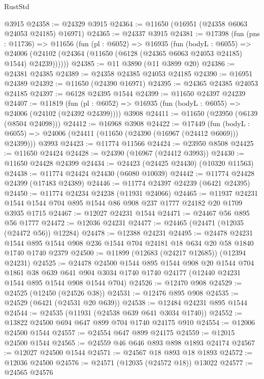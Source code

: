 \begin{lexlean}{RustStd}
\begin{coremodule}
    @3915
@24358 := @24329 @3915
@24364 := @11650 (@16951 (@24358 @6063 @24053 @24185) @16971)
@24365 := @24337 @3915
@24381 := @17398
    (fun (pns : @11736) =>
    @11656
      (fun (pl : @6052) =>
      @16935
        (fun (bodyL : @6055) =>
        @24006 (@24102 (@24364 (@11650 (@6128 (@24365 @6063 @24053 @24185) @1544) @24239))))))
@24385 := @11 @3890 (@11 @3899 @20)
@24386 := @24381 @24385
@24389 := @24358 @24385 @24053 @24185
@24390 := @16951 @24389
@24392 := @11650 (@24390 @16971)
@24395 := @24365 @24385 @24053 @24185
@24397 := @6128 @24395 @1544
@24399 := @11650 @24397 @24239
@24407 := @11819
    (fun (pl : @6052) => @16935 (fun (bodyL : @6055) => @24006 (@24102 (@24392 @24399))))
    @3908
@24411 := @11650 (@23950 (@6139 (@8504 @24098)))
@24412 := @16968 @3908
@24422 := @17449
    (fun (bodyL : @6055) => @24006 (@24411 (@11650 (@24390 (@16967 (@24412 @6069))) @24399)))
    @3993
@24423 := @11774 @11566
@24424 := @23950 @8508
@24425 := @11650 @24424
@24428 := @24390 (@16967 (@24412 @3993))
@24430 := @11650 @24428 @24399
@24434 := @24423 (@24425 @24430) (@10320 @11563)
@24438 := @11774 @24424 @24430 (@6080 @10039)
@24442 := @11774 @24428 @24399 (@17483 @24389)
@24446 := @11774 @24397 @24239 (@6421 @24395)
@24450 := @11774 @24234 @24238 (@11931 @24066)
@24465 := @11937 @24231 @1544 @1544 @704 @895 @1544 @86 @908 @237 @1777 @24182 @20 @1709 @3935 @1715
@24467 := @12027 @24231 @1544
@24471 := @24467 @56 @895 @56 @1777
@24472 := @12036 @24231
@24477 := @24465 (@24471 (@12035 (@24472 @56)) @12284)
@24478 := @12388 @24231
@24495 := @24478
    @24231
    @1544
    @895
    @1544
    @908
    @236
    @1544
    @704
    @24181
    @18
    @634
    @20
    @58
    @1840
    @1740
    @1740
    @2379
@24500 := @11899 (@12683 (@24217 @12685)) (@12394 @24231)
@24525 := @24478
    @24500
    @1544
    @895
    @1544
    @908
    @20
    @1544
    @704
    @1861
    @38
    @639
    @641
    @904
    @3034
    @1740
    @1740
    @24177
    (@12440 @24231 @1544 @895 @1544 @908 @1544 @704)
@24526 := @12470 @908
@24529 := @24525 (@12450 (@24526 @38))
@24531 := @12476 @895 @908
@24535 := @24529 (@6421 (@24531 @20 @639))
@24538 := @12484 @24231 @895 @1544
@24544 := @24535 (@11931 (@24538 @639 @641 @3034 @1740))
@24552 := @13822 @24500 @694 @647 @899 @704 @1740 @24175 @910
@24554 := @12006 @24500 @1544
@24557 := @24554 @647 @899 @24175
@24559 := @12015 @24500 @1544
@24565 := @24559 @46 @646 @893 @898 @1893 @24174
@24567 := @12027 @24500 @1544
@24571 := @24567 @18 @893 @18 @1893
@24572 := @12036 @24500
@24576 := @24571 (@12035 (@24572 @18)) @13022
@24577 := @24565 @24576

\end{coremodule}
\end{lexlean}
